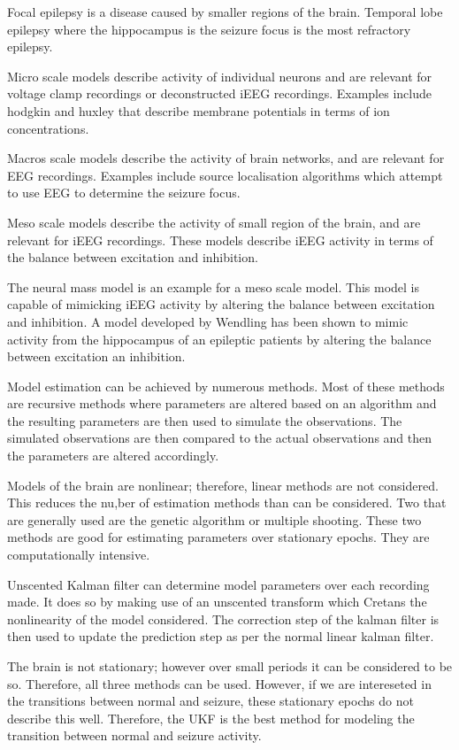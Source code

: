 Focal epilepsy is a disease caused by smaller regions of the brain.
	Temporal lobe epilepsy where the hippocampus is the seizure focus is the most refractory epilepsy. 

Micro scale models describe activity of individual neurons and are relevant for voltage clamp recordings or deconstructed iEEG recordings.
	Examples include hodgkin and huxley that describe membrane potentials in terms of ion concentrations.

Macros scale models describe the activity of brain networks, and are relevant for EEG recordings.
	Examples include source localisation algorithms which attempt to use EEG to determine the seizure focus.

Meso scale models describe the activity of small region of the brain, and are relevant for iEEG recordings.
	These models describe iEEG activity in terms of the balance between excitation and inhibition.
	
The neural mass model is an example for a meso scale model.
  This model is capable of mimicking iEEG activity by altering the balance between excitation and inhibition.
  A model developed by Wendling has been shown to mimic activity from the hippocampus of an epileptic patients by altering the balance between excitation an inhibition.

Model estimation can be achieved by numerous methods. 
	Most of these methods are recursive methods where parameters are altered based on an algorithm and the resulting parameters are then used to simulate the observations. 
	The simulated observations are then compared to the actual observations and then the parameters are altered accordingly.

Models of the brain are nonlinear; therefore, linear methods are not considered. 
	This reduces the nu,ber of estimation methods than can be considered.
	Two that are generally used are the genetic algorithm or multiple shooting.
	These two methods are good for estimating parameters over stationary epochs.
	They are computationally intensive.

Unscented Kalman filter can determine model parameters over each recording made.
	It does so by making use of an unscented transform which Cretans the nonlinearity of the model considered.
	The correction step of the kalman filter is then used to update the prediction step as per the normal linear kalman filter.

The brain is not stationary; however over small periods it can be considered to be so. Therefore, all three methods can be used.
	However, if we are intereseted in the transitions between normal and seizure, these stationary epochs do not describe this well.
	Therefore, the UKF is the best method for modeling the transition between normal and seizure activity. 

